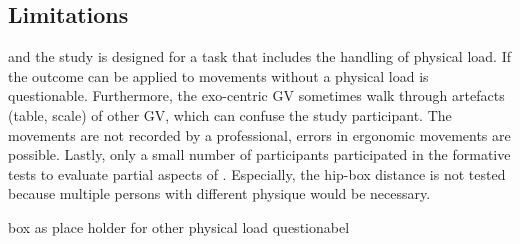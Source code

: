 \subsection{Limitations}
\label{sec:limitations}
\exgo and the study is designed for a task that includes the handling of physical load. If the outcome can be applied to movements without a physical load is questionable. Furthermore, the exo-centric GV sometimes walk through artefacts (table, scale) of other GV, which can confuse the study participant. The movements are not recorded by a professional, errors in ergonomic movements are possible. Lastly, only a small number of participants participated in the formative tests to evaluate partial aspects of \exgo. Especially, the hip-box distance is not tested because multiple persons with different physique would be necessary. 

box as place holder for other physical load questionabel